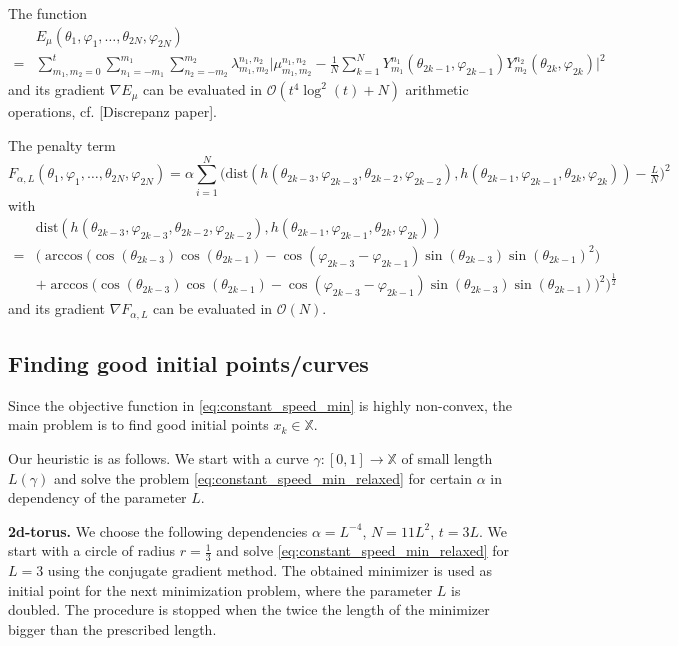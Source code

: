 \documentclass[%
a4paper,11pt,DIV=11,%
abstract=on%
]{scrartcl}
\begin{document}
The function
\[
  \begin{aligned}
    &E_{\mu}(\theta_{1},\varphi_{1},\dots,\theta_{2N},\varphi_{2N}) \\
    = &\sum_{m_{1},m_{2}=0}^{t} \sum_{n_{1}=-m_{1}}^{m_{1}} \sum_{n_{2}=-m_{2}}^{m_{2}} \lambda_{m_{1},m_{2}}^{n_{1},n_{2}} \Big| \mu_{m_{1},m_{2}}^{n_{1},n_{2}} - \frac 1N \sum_{k=1}^{N} Y_{m_{1}}^{n_{1}}(\theta_{2k-1},\varphi_{2k-1}) Y_{m_{2}}^{n_{2}}(\theta_{2k},\varphi_{2k})\Big|^{2}
  \end{aligned}
\]
and its gradient $\nabla E_{\mu}$ can be evaluated in $\mathcal O(t^{4} \log^{2}(t) + N)$ arithmetic operations, cf. {\color{blue}[Discrepanz paper]}.

The penalty term
\[
  F_{\alpha,L}(\theta_{1},\varphi_{1},\dots,\theta_{2N},\varphi_{2N}) = \alpha \sum_{i=1}^{N} \big(  \mathrm{dist}(h(\theta_{2k-3},\varphi_{2k-3},\theta_{2k-2},\varphi_{2k-2}),h(\theta_{2k-1},\varphi_{2k-1},\theta_{2k},\varphi_{2k})) - \tfrac{L}{N}\big)^{2}
\]
with
\[\begin{aligned}
    &\mathrm{dist}(h(\theta_{2k-3},\varphi_{2k-3},\theta_{2k-2},\varphi_{2k-2}),h(\theta_{2k-1},\varphi_{2k-1},\theta_{2k},\varphi_{2k}))\\
    = & \Big( \arccos \Big( \cos(\theta_{2k-3}) \cos(\theta_{2k-1}) - \cos(\varphi_{2k-3}-\varphi_{2k-1}) \sin(\theta_{2k-3})\sin(\theta_{2k-1})^{2}\Big)\\
   & +   \arccos \Big( \cos(\theta_{2k-3}) \cos(\theta_{2k-1}) - \cos(\varphi_{2k-3}-\varphi_{2k-1}) \sin(\theta_{2k-3})\sin(\theta_{2k-1})\Big)^{2}\Big)^{\frac12}
  \end{aligned}
\]
and its gradient $\nabla F_{\alpha,L}$ can be evaluated in $\mathcal O(N)$.


\subsection{Finding good initial points/curves}

Since the objective function in \eqref{eq:constant_speed_min} is highly non-convex, the main problem is to find good initial points $x_{k} \in \mathbb X$.

Our heuristic is as follows. We start with a curve $\gamma:[0,1]\to \mathbb X$ of small length $L(\gamma)$ and solve the problem \eqref{eq:constant_speed_min_relaxed} for certain $\alpha$ in dependency of the parameter $L$.

\textbf{2d-torus.}
We choose the following dependencies $\alpha = L^{-4}$, $N =11 L^{2}$, $t=3 L$. We start with a circle of radius $r=\frac13$ and solve \eqref{eq:constant_speed_min_relaxed} for $L=3$ using the conjugate gradient method. The obtained minimizer is used as initial point for the next minimization problem, where the parameter $L$ is doubled. The procedure is stopped when the twice the length of the minimizer bigger than the prescribed length.
\end{document}
